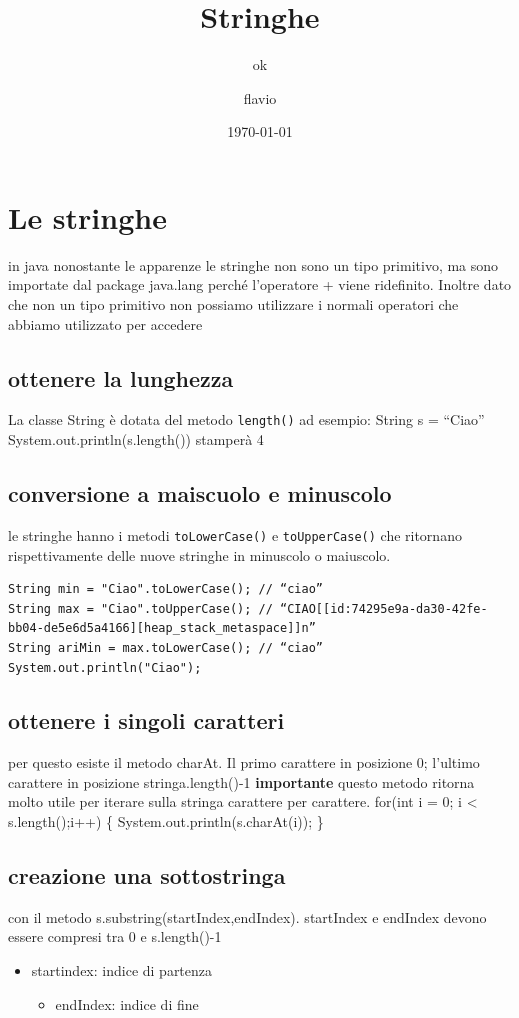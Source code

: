 \documentclass[11pt]{article}
\author{ok}
\author{flavio}
\date{\today}
\title{Stringhe}
\begin{document}
\maketitle
\tableofcontents

\section{Le stringhe}
\label{sec:orga5beefd}
in java nonostante le apparenze le stringhe non sono un tipo primitivo, ma sono importate dal package java.lang perché l'operatore + viene ridefinito. Inoltre dato che non un tipo primitivo non possiamo utilizzare i normali operatori che abbiamo utilizzato per accedere
\subsection{ottenere la lunghezza}
\label{sec:org77d2a10}

La classe String è dotata del metodo \texttt{length()} ad esempio:
String s = ``Ciao''
System.out.println(s.length()) stamperà 4
\subsection{conversione a maiscuolo e minuscolo}
\label{sec:orgece5149}
le stringhe hanno i metodi \texttt{toLowerCase()} e \texttt{toUpperCase()} che ritornano rispettivamente delle nuove stringhe in minuscolo o maiuscolo.
\begin{verbatim}
String min = "Ciao".toLowerCase(); // “ciao”
String max = "Ciao".toUpperCase(); // “CIAO[[id:74295e9a-da30-42fe-bb04-de5e6d5a4166][heap_stack_metaspace]]n”
String ariMin = max.toLowerCase(); // “ciao”
System.out.println("Ciao");
\end{verbatim}
\subsection{ottenere i singoli caratteri}
\label{sec:orge403266}
per questo esiste il metodo charAt. Il primo carattere in posizione 0; l'ultimo carattere in posizione stringa.length()-1
\textbf{importante}
questo metodo ritorna molto utile per iterare sulla stringa carattere per carattere.
for(int i = 0; i < s.length();i++)
\{
System.out.println(s.charAt(i));
\}
\subsection{creazione una sottostringa}
\label{sec:org8c0eccb}
con il metodo s.substring(startIndex,endIndex). startIndex e endIndex devono essere compresi tra 0 e s.length()-1
\begin{itemize}
\item startindex: indice di partenza
\begin{itemize}
\item endIndex: indice di fine
\end{itemize}
\end{itemize}
\end{document}
